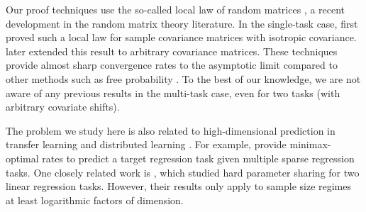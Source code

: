 Our proof techniques use the so-called local law of random matrices \cite{erdos2017dynamical}, a recent development in the random matrix theory literature.
In the single-task case, \citet{isotropic} first proved such a local law for sample covariance matrices with isotropic covariance.
\citet{Anisotropic} later extended this result to arbitrary covariance matrices.
These techniques provide almost sharp convergence rates to the asymptotic limit compared to other methods such as free probability \cite{nica2006lectures}.
To the best of our knowledge, we are not aware of any previous results in the multi-task case, even for two tasks (with arbitrary covariate shifts).

The problem we study here is also related to high-dimensional prediction in transfer learning \cite{li2020transfer,bastani2020predicting} and distributed learning \cite{dobriban2018high}.
For example, \citet{li2020transfer} provide minimax-optimal rates to predict a target regression task given multiple sparse regression tasks.
One closely related work is \citet{WZR20}, which studied hard parameter sharing for two linear regression tasks.
However, their results only apply to sample size regimes at least logarithmic factors of dimension.



